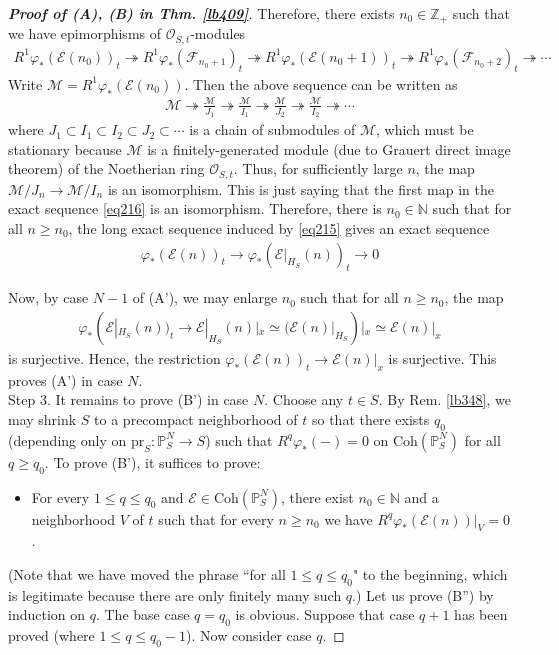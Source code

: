 \documentclass[12pt,b5paper,notitlepage]{report}
\theoremstyle{definition}
\theoremstyle{plain}
\newcommand{\mc}{\mathcal}
\newcommand{\scr}{\mathscr}
\newcommand{\Nbb}{\mathbb N}
\newcommand{\Zbb}{\mathbb Z}
\newcommand{\Pbb}{\mathbb P}
\newcommand{\pr}{\mathrm {pr}}
\newcommand{\Coh}{\mathrm{Coh}}
\numberwithin{equation}{section}
\begin{document}
\begin{proof}[\textbf{Proof of (A), (B) in Thm. \ref{lb409}}]
Therefore, there exists $n_0\in\Zbb_+$ such that we have epimorphisms of $\scr O_{S,t}$-modules
\begin{align*}
R^1\varphi_*(\scr E(n_0))_t\twoheadrightarrow R^1\varphi_*(\scr F_{n_0+1})_t\twoheadrightarrow R^1\varphi_*(\scr E(n_0+1))_t\twoheadrightarrow R^1\varphi_*(\scr F_{n_0+2})_t\twoheadrightarrow\cdots
\end{align*}
Write $\mc M=R^1\varphi_*(\scr E(n_0))$. Then the above sequence can be written as
\begin{align*}
\mc M\twoheadrightarrow\frac{\mc M}{J_1}\twoheadrightarrow \frac{\mc M}{I_1}\twoheadrightarrow\frac{\mc M}{J_2}\twoheadrightarrow \frac{\mc M}{I_2}\twoheadrightarrow\cdots
\end{align*}
where $J_1\subset I_1\subset I_2\subset J_2\subset\cdots$ is a chain of submodules of $\mc M$, which must be stationary because $\mc M$ is a finitely-generated module (due to Grauert direct image theorem) of the Noetherian ring $\scr O_{S,t}$.  Thus, for sufficiently large $n$, the map $\mc M/J_n\rightarrow\mc M/I_n$ is an isomorphism. This is just saying that the first map in the exact sequence \eqref{eq216} is an isomorphism. Therefore, there is $n_0\in\Nbb$ such that for all $n\geq n_0$, the long exact sequence induced by \eqref{eq215} gives an exact sequence
\begin{align}
\varphi_*(\scr E(n))_t\rightarrow \varphi_*(\scr E|_{H_S}(n))_t\rightarrow 0
\end{align}

Now, by case $N-1$ of (A'), we may enlarge $n_0$ such that for all $n\geq n_0$, the map 
\begin{align*}
\varphi_*(\scr E|_{H_S}(n))_t\rightarrow \scr E|_{H_S}(n)|_x\simeq(\scr E(n)|_{H_S})|_x\simeq\scr E(n)|_x
\end{align*}
is surjective. Hence, the restriction $\varphi_*(\scr E(n))_t\rightarrow\scr E(n)|_x$ is surjective. This proves (A') in case $N$. \\[-1ex]

Step 3. It remains to prove (B') in case $N$. Choose any $t\in S$. By Rem. \ref{lb348}, we may shrink $S$ to a precompact neighborhood of $t$ so that  there exists $q_0$ (depending only on $\pr_S:\Pbb^N_S\rightarrow S$) such that $R^q\varphi_*(-)=0$ on $\Coh(\Pbb^N_S)$ for all $q\geq q_0$. To prove (B'), it suffices to prove:
\begin{itemize}
\item[(B'')] For every $1\leq q\leq q_0$ and $\scr E\in\Coh(\Pbb^N_S)$, there exist $n_0\in\Nbb$ and a neighborhood $V$ of $t$ such that for every $n\geq n_0$ we have $R^q\varphi_*(\scr E(n))|_V=0$.
\end{itemize}
(Note that we have moved the phrase ``for all $1\leq q\leq q_0$" to the beginning, which is legitimate because there are only finitely many such $q$.) Let us prove (B'') by induction on $q$. The base case $q=q_0$ is obvious.  Suppose that case $q+1$ has been proved (where $1\leq q\leq q_0-1$). Now consider case $q$.


\end{proof}
\end{document}
